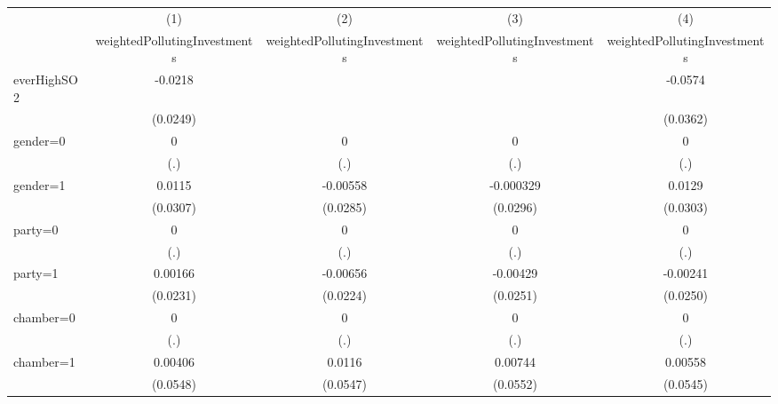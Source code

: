 {
\def\sym#1{\ifmmode^{#1}\else\(^{#1}\)\fi}
\begin{tabular}{l*{4}{c}}
\toprule
                    &\multicolumn{1}{c}{(1)}&\multicolumn{1}{c}{(2)}&\multicolumn{1}{c}{(3)}&\multicolumn{1}{c}{(4)}\\
                    &\multicolumn{1}{c}{weightedPollutingInvestments}&\multicolumn{1}{c}{weightedPollutingInvestments}&\multicolumn{1}{c}{weightedPollutingInvestments}&\multicolumn{1}{c}{weightedPollutingInvestments}\\
\midrule
everHighSO2         &     -0.0218         &                     &                     &     -0.0574         \\
                    &    (0.0249)         &                     &                     &    (0.0362)         \\
\addlinespace
gender=0            &           0         &           0         &           0         &           0         \\
                    &         (.)         &         (.)         &         (.)         &         (.)         \\
\addlinespace
gender=1            &      0.0115         &    -0.00558         &   -0.000329         &      0.0129         \\
                    &    (0.0307)         &    (0.0285)         &    (0.0296)         &    (0.0303)         \\
\addlinespace
party=0             &           0         &           0         &           0         &           0         \\
                    &         (.)         &         (.)         &         (.)         &         (.)         \\
\addlinespace
party=1             &     0.00166         &    -0.00656         &    -0.00429         &    -0.00241         \\
                    &    (0.0231)         &    (0.0224)         &    (0.0251)         &    (0.0250)         \\
\addlinespace
chamber=0           &           0         &           0         &           0         &           0         \\
                    &         (.)         &         (.)         &         (.)         &         (.)         \\
\addlinespace
chamber=1           &     0.00406         &      0.0116         &     0.00744         &     0.00558         \\
                    &    (0.0548)         &    (0.0547)         &    (0.0552)         &    (0.0545)         \\

\end{tabular}}
